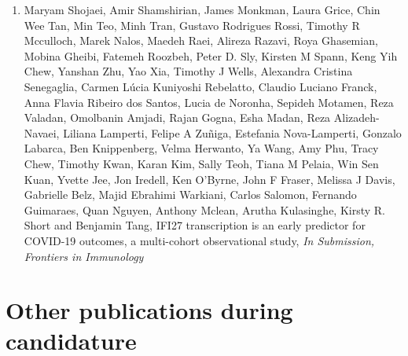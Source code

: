 \begin{instructional}
\begin{enumerate}
    \item Maryam Shojaei, Amir Shamshirian, James Monkman, Laura Grice, Chin Wee Tan, Min Teo, Minh Tran, Gustavo Rodrigues Rossi, Timothy R Mcculloch, Marek Nalos, Maedeh Raei, Alireza Razavi, Roya Ghasemian, Mobina Gheibi, Fatemeh Roozbeh, Peter D. Sly, Kirsten M Spann, Keng Yih Chew, Yanshan Zhu, Yao Xia, Timothy J Wells, Alexandra Cristina Senegaglia, Carmen Lúcia Kuniyoshi Rebelatto, Claudio Luciano Franck, Anna Flavia Ribeiro dos Santos, Lucia de Noronha, Sepideh Motamen, Reza Valadan, Omolbanin Amjadi, Rajan Gogna, Esha Madan, Reza Alizadeh-Navaei, Liliana Lamperti, Felipe A Zuñiga, Estefania Nova-Lamperti, Gonzalo Labarca, Ben Knippenberg, Velma Herwanto, Ya Wang, Amy Phu, Tracy Chew, Timothy Kwan, Karan Kim, Sally Teoh, Tiana M Pelaia, Win Sen Kuan, Yvette Jee, Jon Iredell, Ken O'Byrne, John F Fraser, Melissa J Davis, Gabrielle Belz, Majid Ebrahimi Warkiani, Carlos Salomon, Fernando Guimaraes, Quan Nguyen, Anthony Mclean, Arutha Kulasinghe, Kirsty R. Short and Benjamin Tang, IFI27 transcription is an early predictor for COVID-19 outcomes, a multi-cohort observational study, \textit{In Submission, Frontiers in Immunology}
    \end{enumerate}
\end{instructional}





\section*{Other publications during candidature}


